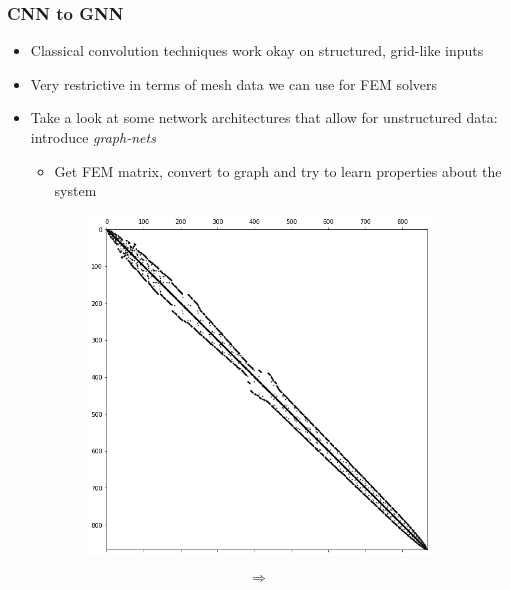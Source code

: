 \documentclass[handout]{beamer}
\begin{document}
\begin{frame}
  \frametitle{CNN to GNN}
  \begin{itemize}
  \item Classical convolution techniques work okay on structured, grid-like inputs
  \item Very restrictive in terms of mesh data we can use for FEM solvers
  \item Take a look at some network architectures that allow for unstructured data: introduce \textit{graph-nets}
    \begin{itemize}
      \item Get FEM matrix, convert to graph and try to learn properties about the system
    \end{itemize}
  \end{itemize}
    \begin{figure}[h]
  \begin{subfigure}{.4\textwidth}
    \includegraphics[width=\textwidth]{figures/sparse.png}
  \end{subfigure}
  \begin{subfigure}{.08\textwidth}
    \[ \Longrightarrow \]
  \end{subfigure}
  \begin{subfigure}{.40\textwidth}

\end{subfigure}
\end{figure}
\end{frame}
\end{document}
